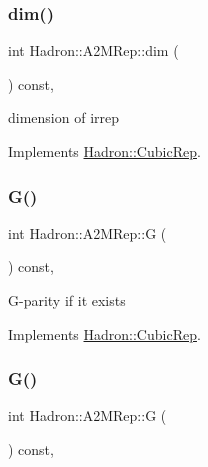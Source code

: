 \subsubsection{\texorpdfstring{dim()}{dim()}\hspace{0.1cm}{\footnotesize\ttfamily [3/3]}}
{\footnotesize\ttfamily int Hadron\+::\+A2\+M\+Rep\+::dim (\begin{DoxyParamCaption}{ }\end{DoxyParamCaption}) const\hspace{0.3cm}{\ttfamily [inline]}, {\ttfamily [virtual]}}

dimension of irrep 

Implements \mbox{\hyperlink{structHadron_1_1CubicRep_ac178d14064f037a66af4b9fb4b312d51}{Hadron\+::\+Cubic\+Rep}}.

\mbox{\label{structHadron_1_1A2MRep_a2850984bf027d7ac1b39ce7ff94c6d00}} 
\subsubsection{\texorpdfstring{G()}{G()}\hspace{0.1cm}{\footnotesize\ttfamily [1/3]}}
{\footnotesize\ttfamily int Hadron\+::\+A2\+M\+Rep\+::G (\begin{DoxyParamCaption}{ }\end{DoxyParamCaption}) const\hspace{0.3cm}{\ttfamily [inline]}, {\ttfamily [virtual]}}

G-\/parity if it exists 

Implements \mbox{\hyperlink{structHadron_1_1CubicRep_a52104e43266d1614c00bbd1c3b395458}{Hadron\+::\+Cubic\+Rep}}.

\mbox{\label{structHadron_1_1A2MRep_a2850984bf027d7ac1b39ce7ff94c6d00}} 
\subsubsection{\texorpdfstring{G()}{G()}\hspace{0.1cm}{\footnotesize\ttfamily [2/3]}}
{\footnotesize\ttfamily int Hadron\+::\+A2\+M\+Rep\+::G (\begin{DoxyParamCaption}{ }\end{DoxyParamCaption}) const\hspace{0.3cm}{\ttfamily [inline]}, {\ttfamily [virtual]}}

